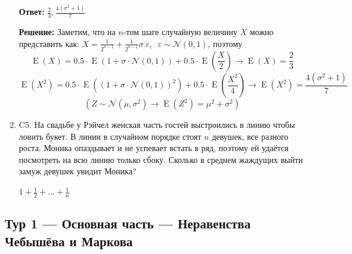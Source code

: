 \documentclass[12pt]{article}
\DeclareMathOperator{\E}{E}
\def \cN{\mathcal{N}}
\newenvironment{problem}{}{}
\newenvironment{sol}{}{} %
\begin{document}
\begin{enumerate}
\begin{problem}
\begin{sol}
\textbf{Ответ:} $\frac{2}{3},\frac{4(\sigma^2+1)}{7}$

\textbf{Решение:} Заметим, что на $n$-том шаге случайную величину $X$ можно представить как: $X = \frac{1}{2^{n-1}}+\frac{1}{2^{n-1}}\sigma^\cdot\varepsilon,\;\; \varepsilon\sim \cN(0,1)$, поэтому
\[
\E(X)= 0.5\cdot \E(1+\sigma\cdot \cN(0,1)) + 0.5\cdot \E\left(\frac{X}{2}\right)   \rightarrow \E(X)=\frac{2}{3}
\]
\[
\E(X^2)= 0.5\cdot \E((1+\sigma\cdot \cN(0,1))^2) + 0.5\cdot \E\left(\frac{X^2}{4}\right)
\rightarrow \E(X^2)=\frac{4(\sigma^2+1)}{7}
\]
\[
(Z\sim \cN(\mu,\sigma^2)\rightarrow \E(Z^2)=\mu^2 + \sigma^2)
\]
\end{sol}
\end{problem}


\begin{problem}
\item[C5.] На свадьбе у Рэйчел женская часть гостей выстроились в линию чтобы ловить букет. В линии в случайном порядке стоят $n$ девушек, все разного роста. Моника  опаздывает и не успевает встать в ряд, поэтому ей удаётся посмотреть на всю линию только сбоку. Сколько в среднем жаждущих выйти замуж девушек увидит Моника? 

\begin{sol}
$1+\frac{1}{2}+\dots+\frac{1}{n}$
\end{sol}
\end{problem}
\end{enumerate}

\newpage
\subsection{Тур 1 — Основная часть — Неравенства Чебышёва и Маркова}
\end{document}

